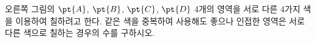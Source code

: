 \noindent\begin{minipage}[t]{0.58\linewidth}\vspace{0pt}\raggedright 오른쪽 그림의 $\pt{A}$, $\pt{B}$, $\pt{C}$, $\pt{D}$ 4개의 영역을 서로 다른 4가지 색을 이용하여 칠하려고 한다. 같은 색을 중복하여 사용해도 좋으나 인접한 영역은 서로 다른 색으로 칠하는 경우의 수를 구하시오. \end{minipage}\hfill\begin{minipage}[t]{0.4\linewidth}\vspace{0pt}\centering \resizebox{\ifdim\width>\linewidth\linewidth\else\width\fi}{!}{}\end{minipage}\par
